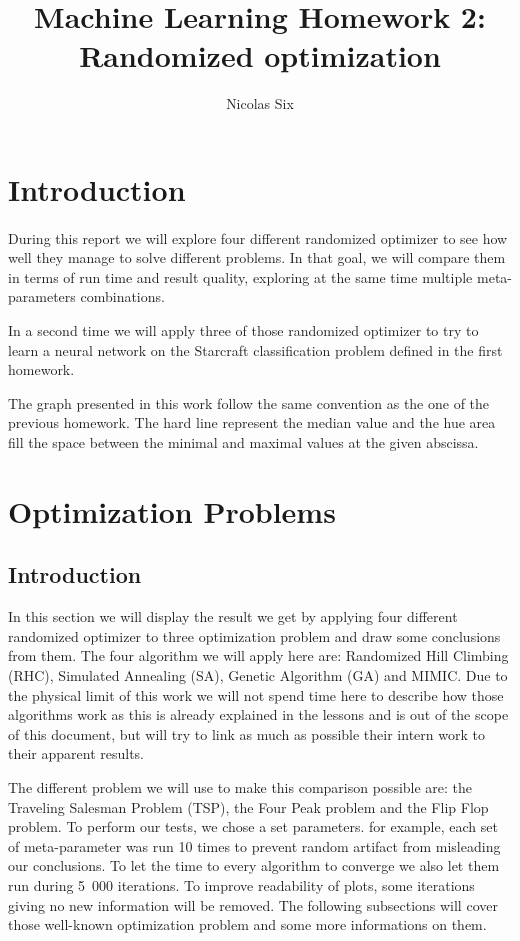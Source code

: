 \documentclass[twocolumn,a4paper,10pt]{article}
\title{Machine Learning Homework 2:\\Randomized optimization}
\author{Nicolas Six}
\begin{document}
\maketitle \tableofcontents{}

\section{Introduction}

\paragraph{}

During this report we will explore four different randomized optimizer
to see how well they manage to solve different problems. In that goal,
we will compare them in terms of run time and result quality, exploring
at the same time multiple meta-parameters combinations.

In a second time we will apply three of those randomized optimizer
to try to learn a neural network on the Starcraft classification problem
defined in the first homework.

The graph presented in this work follow the same convention as the
one of the previous homework. The hard line represent the median value
and the hue area fill the space between the minimal and maximal values
at the given abscissa.

\section{Optimization Problems}

\label{pb} 

\subsection{Introduction}

In this section we will display the result we get by applying four
different randomized optimizer to three optimization problem and draw
some conclusions from them. The four algorithm we will apply here
are: Randomized Hill Climbing (RHC), Simulated Annealing (SA), Genetic
Algorithm (GA) and MIMIC. Due to the physical limit of this work we
will not spend time here to describe how those algorithms work as
this is already explained in the lessons and is out of the scope of
this document, but will try to link as much as possible their intern
work to their apparent results.

The different problem we will use to make this comparison possible
are: the Traveling Salesman Problem (TSP), the Four Peak problem and
the Flip Flop problem. %
To perform our tests, we chose a set parameters. for example, each set of meta-parameter was run 10 times to prevent random artifact from misleading our conclusions. To let the time to every algorithm to converge we also let them run during 5~000 iterations. To improve readability of plots, some iterations giving no new information will be removed.
The following subsections will cover those well-known optimization
problem and some more informations on them.
\end{document}
